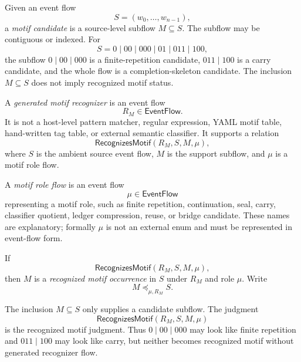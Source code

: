 \begin{definition}
\label{def:motif-report-candidate}
Given an event flow
$$
  S=(w_0,\ldots,w_{n-1}),
$$
a \emph{motif candidate} is a source-level subflow $M\subseteq S$. The subflow may be contiguous or indexed. For
$$
  S=0\mid 00\mid 000\mid 01\mid 011\mid 100,
$$
the subflow $0\mid 00\mid 000$ is a finite-repetition candidate, $011\mid 100$ is a carry candidate, and the whole flow is a completion-skeleton candidate. The inclusion $M\subseteq S$ does not imply recognized motif status.
\end{definition}

\begin{definition}
\label{def:motif-report-generated-recognizer}
A \emph{generated motif recognizer} is an event flow
$$
  R_M\in\mathsf{EventFlow}.
$$
It is not a host-level pattern matcher, regular expression, YAML motif table, hand-written tag table, or external semantic classifier. It supports a relation
$$
  \mathsf{RecognizesMotif}(R_M,S,M,\mu),
$$
where $S$ is the ambient source event flow, $M$ is the support subflow, and $\mu$ is a motif role flow.
\end{definition}

\begin{definition}
\label{def:motif-report-role-flow}
A \emph{motif role flow} is an event flow
$$
  \mu\in\mathsf{EventFlow}
$$
representing a motif role, such as finite repetition, continuation, seal, carry, classifier quotient, ledger compression, reuse, or bridge candidate. These names are explanatory; formally $\mu$ is not an external enum and must be represented in event-flow form.
\end{definition}

\begin{definition}
\label{def:motif-report-recognized-occurrence}
If
$$
  \mathsf{RecognizesMotif}(R_M,S,M,\mu),
$$
then $M$ is a \emph{recognized motif occurrence} in $S$ under $R_M$ and role $\mu$. Write
$$
  M\preceq_{\mu,R_M}S.
$$
\end{definition}

\begin{remark}
\label{rem:motif-report-candidate-weaker}
The inclusion $M\subseteq S$ only supplies a candidate subflow. The judgment
$$
  \mathsf{RecognizesMotif}(R_M,S,M,\mu)
$$
is the recognized motif judgment. Thus $0\mid 00\mid 000$ may look like finite repetition and $011\mid 100$ may look like carry, but neither becomes recognized motif without generated recognizer flow.
\end{remark}

